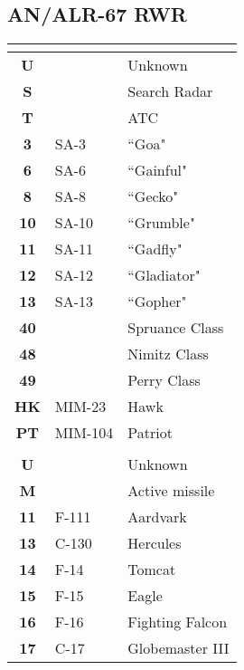 \documentclass[fontInter, widesubsec]{TechCheck}
\begin{document}
	\subsection{AN/ALR-67 RWR}
	\begin{multicols*}{2}
		\begin{center}
			\begin{tabular}{c | p{1.5cm}  p{2.5cm}}
				\toprule
				\multicolumn{3}{c}{\blue{SURFACE}} \\
				\midrule
				\textbf{U} & & Unknown \\
				\textbf{S} & & Search Radar \\
				\textbf{T} & & ATC\\
				\midrule
				\textbf{3} & SA-3 & ``Goa" \\
				\textbf{6} & SA-6 & ``Gainful" \\
				\textbf{8} & SA-8 & ``Gecko" \\
				\midrule
				\textbf{10} & SA-10 & ``Grumble" \\
				\textbf{11} & SA-11 & ``Gadfly" \\
				\textbf{12} & SA-12 & ``Gladiator" \\
				\textbf{13} & SA-13 & ``Gopher" \\
				\midrule
				\textbf{40} & & Spruance Class \\
				\textbf{48} & & Nimitz Class \\
				\textbf{49} & & Perry Class \\
				\midrule
				\textbf{HK} & MIM-23 & Hawk \\
				\textbf{PT} & MIM-104 & Patriot \\
				\midrule
				\multicolumn{3}{c}{\blue{AIRBORNE}} \\
				\toprule
				\textbf{U} & & Unknown \\
				\textbf{M} & & Active missile \\
				\midrule
				\textbf{11} & F-111 &  Aardvark \\
				\textbf{13} & C-130 & Hercules \\
				\midrule
				\textbf{14} & F-14 & Tomcat \\
				\textbf{15} & F-15 & Eagle \\
				\textbf{16} & F-16 & Fighting Falcon \\
				\textbf{17} & C-17 & Globemaster III \\

\end{tabular}
\end{center}
\end{multicols*}
\end{document}

